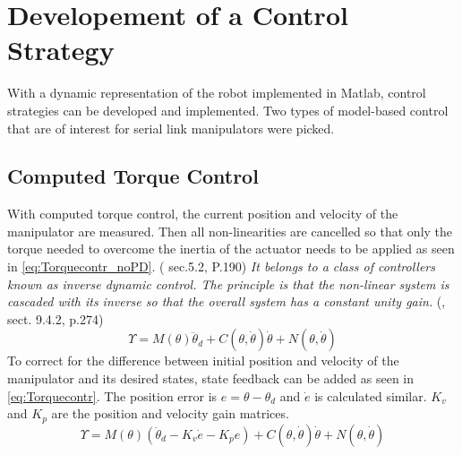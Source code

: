 \chapter{Developement of a Control Strategy}

With a dynamic representation of the robot implemented in Matlab, control strategies can be developed and implemented. 
Two types of model-based control that are of interest for serial link manipulators were picked.

\section{Computed Torque Control}
With computed torque control, the current position and velocity of the manipulator are measured. Then all non-linearities are cancelled so that only the torque needed to overcome the inertia of the actuator needs to be applied as seen in \ref{eq:Torquecontr_noPD}. (\cite{MathIntroRobManip} sec.5.2, P.190)
\textit{It belongs to a class of controllers known as inverse dynamic control. The principle is that the non-linear system is cascaded with its inverse so that the overall system has a constant unity gain.} (\cite{CorkeRoboticVisionControl}, sect. 9.4.2, p.274)\\
\begin{equation}\label{eq:Torquecontr_noPD}
	\Upsilon = M(\theta)\ddot{\theta}_d + C(\theta,\dot{\theta})\dot{\theta} + N(\theta,\dot{\theta})
\end{equation}
To correct for the difference between initial position and velocity of the manipulator and its desired states, state feedback can be added as seen in \ref{eq:Torquecontr}. The position error is $e=\theta - \theta_d $ and $\dot{e}$ is calculated similar. $K_v$ and $K_p$ are the position and velocity gain matrices. \cite{MathIntroRobManip}
\begin{equation}\label{eq:Torquecontr}
	\Upsilon = M(\theta)(\ddot{\theta}_d -K_v \dot{e} - K_p e) + C(\theta,\dot{\theta})\dot{\theta} + N(\theta,\dot{\theta})
\end{equation}

